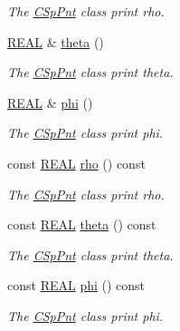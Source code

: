 \begin{DoxyCompactItemize}
\begin{DoxyCompactList}\small\item\em The \hyperlink{classCSpPnt}{C\-Sp\-Pnt} class print rho. \end{DoxyCompactList}\item 
\hyperlink{util_8h_a5821460e95a0800cf9f24c38915cbbde}{R\-E\-A\-L} \& \hyperlink{classCSpPnt_a4b48e7760135fc768ab6911a328194ba}{theta} ()
\begin{DoxyCompactList}\small\item\em The \hyperlink{classCSpPnt}{C\-Sp\-Pnt} class print theta. \end{DoxyCompactList}\item 
\hyperlink{util_8h_a5821460e95a0800cf9f24c38915cbbde}{R\-E\-A\-L} \& \hyperlink{classCSpPnt_af4f411d4a656dfec7c5a69ba065dbe1d}{phi} ()
\begin{DoxyCompactList}\small\item\em The \hyperlink{classCSpPnt}{C\-Sp\-Pnt} class print phi. \end{DoxyCompactList}\item 
const \hyperlink{util_8h_a5821460e95a0800cf9f24c38915cbbde}{R\-E\-A\-L} \hyperlink{classCSpPnt_ad7366f49f0fde0b19a3682ace6b606ba}{rho} () const 
\begin{DoxyCompactList}\small\item\em The \hyperlink{classCSpPnt}{C\-Sp\-Pnt} class print rho. \end{DoxyCompactList}\item 
const \hyperlink{util_8h_a5821460e95a0800cf9f24c38915cbbde}{R\-E\-A\-L} \hyperlink{classCSpPnt_aed72be0c307a800a1b7565ba80d87e1f}{theta} () const 
\begin{DoxyCompactList}\small\item\em The \hyperlink{classCSpPnt}{C\-Sp\-Pnt} class print theta. \end{DoxyCompactList}\item 
const \hyperlink{util_8h_a5821460e95a0800cf9f24c38915cbbde}{R\-E\-A\-L} \hyperlink{classCSpPnt_a4ecdc3162c71e20aed001b40a497a339}{phi} () const 
\begin{DoxyCompactList}\small\item\em The \hyperlink{classCSpPnt}{C\-Sp\-Pnt} class print phi. \end{DoxyCompactList}\end{DoxyCompactItemize}
